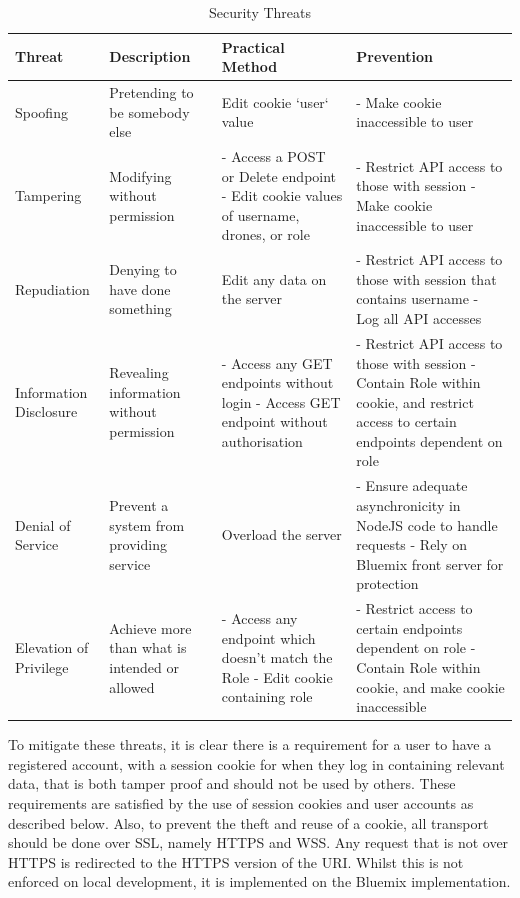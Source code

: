 \documentclass{article}
\begin{document}
\begin{table}[h]  
\caption{Security Threats\label{tab:SecurityThreats}}
\centering
\renewcommand{\arraystretch}{1.5}
\begin{tabularx}{\textwidth}{ | >{\centering}p{1.5cm} |  >{\centering}p{3cm} | X  | X |}
\hline
Threat & Description & Practical Method & Prevention \\ [0.5ex]
\hline
Spoofing & Pretending to be somebody else & Edit cookie `user` value & - Make cookie inaccessible to user \\ \hline
Tampering & Modifying without permission & - Access a POST or Delete endpoint \newline - Edit cookie values of username, drones, or role & - Restrict API access to those with session \newline - Make cookie inaccessible to user \\  \hline
Repudiation & Denying to have done something & Edit any data on the server & - Restrict API access to those with session that contains username \newline - Log all API accesses \\ \hline
Information Disclosure & Revealing information without permission & - Access any GET endpoints without login \newline - Access GET endpoint without authorisation & - Restrict API access to those with session \newline - Contain Role within cookie, and restrict access to certain endpoints dependent on role \\ \hline
Denial of Service & Prevent a system from providing service & Overload the server & - Ensure adequate asynchronicity in NodeJS code to handle requests \newline - Rely on Bluemix front server for protection \\ \hline
Elevation of Privilege & Achieve more than what is intended or allowed & - Access any endpoint which doesn't match the Role \newline - Edit cookie containing role & - Restrict access to certain endpoints dependent on role \newline - Contain Role within cookie, and make cookie inaccessible \\ 
\hline
\end{tabularx}
\end{table}
To mitigate these threats, it is clear there is a requirement for a user to have a registered account, with a session cookie for when they log in containing relevant data, that is both tamper proof and should not be used by others. These requirements are satisfied by the use of session cookies and user accounts as described below. Also, to prevent the theft and reuse of a cookie, all transport should be done over SSL, namely HTTPS and WSS. Any request that is not over HTTPS is redirected to the HTTPS version of the URI. Whilst this is not enforced on local development, it is implemented on the Bluemix implementation.
\end{document}
